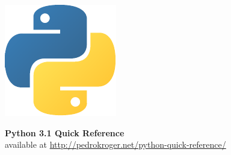 \documentclass{article}
\begin{document}
\begin{minipage}[b]{0.1\linewidth}
\includegraphics[scale=.64]{python-logo-notext}
\end{minipage}
\hfill
\begin{minipage}[b]{0.9\linewidth}
{\Huge \textcolor{pythonblue}{\textsf{\textbf{Python 3.1 Quick Reference}}}} \\
{\large available at \url{http://pedrokroger.net/python-quick-reference/}} \\
\vspace{.8em}
\end{minipage}

\hrulefill
\end{document}
